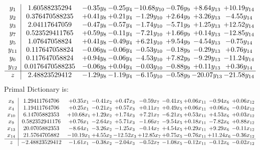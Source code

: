\documentclass[9pt]{article}
\begin{document}
\[\begin{array}{c| c c@{\hskip 2pt} c@{\hskip 2pt} c@{\hskip 2pt} c@{\hskip 2pt} c@{\hskip 2pt} c@{\hskip 2pt} }
 y_{1}   &  1.60588235294 & -0.35 y_{8} & -0.25 y_{4} & -10.68 y_{10} & -0.76 y_{9} & +  8.64 y_{13} & + 10.19 y_{14}\\
 y_{2}   &  0.376470588235 & +  0.41 y_{8} & +  0.21 y_{4} & -1.29 y_{10} & +  2.64 y_{9} & +  3.26 y_{13} & -4.55 y_{14}\\
 y_{3}   &  2.04117647059 & -0.47 y_{8} & -0.57 y_{4} & -1.74 y_{10} & -5.71 y_{9} & +  1.25 y_{13} & + 12.52 y_{14}\\
 y_{7}   &  0.523529411765 & +  0.59 y_{8} & -0.11 y_{4} & -7.21 y_{10} & +  1.66 y_{9} & +  0.14 y_{13} & -12.85 y_{14}\\
 y_{5}   &  1.07647058824 & +  0.41 y_{8} & -0.49 y_{4} & +  6.21 y_{10} & +  9.54 y_{9} & -4.54 y_{13} & -0.75 y_{14}\\
 y_{11}   &  0.117647058824 & -0.06 y_{8} & -0.06 y_{4} & -0.53 y_{10} & -0.18 y_{9} & -0.29 y_{13} & +  0.76 y_{14}\\
 y_{6}   &  0.117647058824 & +  0.94 y_{8} & -0.06 y_{4} & -4.53 y_{10} & +  7.82 y_{9} & -9.29 y_{13} & -11.24 y_{14}\\
 y_{12}   &  0.0176470588235 & -0.06 y_{8} & +  0.04 y_{4} & -0.03 y_{10} & -0.88 y_{9} & +  0.11 y_{13} & +  0.36 y_{14}\\
\hline
z    &  2.48823529412 & -1.29 y_{8} & -1.19 y_{4} & -6.15 y_{10} & -0.58 y_{9} & -20.07 y_{13} & -21.58 y_{14}\\
\end{array}\]
Primal Dictionary is:
\[\begin{array}{c| c c@{\hskip 2pt} c@{\hskip 2pt} c@{\hskip 2pt} c@{\hskip 2pt} c@{\hskip 2pt} c@{\hskip 2pt} c@{\hskip 2pt} c@{\hskip 2pt} }
 x_{8}   &  1.29411764706 & +  0.35 x_{1} & -0.41 x_{2} & +  0.47 x_{3} & -0.59 x_{7} & -0.41 x_{5} & +  0.06 x_{11} & -0.94 x_{6} & +  0.06 x_{12}\\
 x_{4}   &  1.19411764706 & +  0.25 x_{1} & -0.21 x_{2} & +  0.57 x_{3} & +  0.11 x_{7} & +  0.49 x_{5} & +  0.06 x_{11} & +  0.06 x_{6} & -0.04 x_{12}\\
 x_{10}   &  6.14705882353 & + 10.68 x_{1} & +  1.29 x_{2} & +  1.74 x_{3} & +  7.21 x_{7} & -6.21 x_{5} & +  0.53 x_{11} & +  4.53 x_{6} & +  0.03 x_{12}\\
 x_{9}   &  0.582352941176 & +  0.76 x_{1} & -2.64 x_{2} & +  5.71 x_{3} & -1.66 x_{7} & -9.54 x_{5} & +  0.18 x_{11} & -7.82 x_{6} & +  0.88 x_{12}\\
 x_{13}   &  20.0705882353 & -8.64 x_{1} & -3.26 x_{2} & -1.25 x_{3} & -0.14 x_{7} & +  4.54 x_{5} & +  0.29 x_{11} & +  9.29 x_{6} & -0.11 x_{12}\\
 x_{14}   &  21.5764705882 & -10.19 x_{1} & +  4.55 x_{2} & -12.52 x_{3} & + 12.85 x_{7} & +  0.75 x_{5} & -0.76 x_{11} & + 11.24 x_{6} & -0.36 x_{12}\\
\hline
z    &  -2.48823529412 & -1.61 x_{1} & -0.38 x_{2} & -2.04 x_{3} & -0.52 x_{7} & -1.08 x_{5} & -0.12 x_{11} & -0.12 x_{6} & -0.02 x_{12}\\
\end{array}\]
\end{document}
